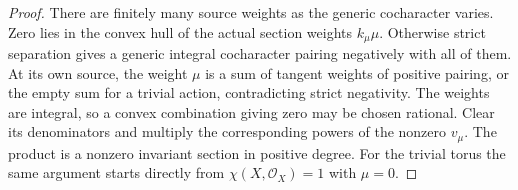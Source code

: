 \begin{proof}
There are finitely many source weights as the generic cocharacter
varies.  Zero lies in the convex hull of the actual section weights
$k_\mu\mu$.  Otherwise strict separation gives a generic integral
cocharacter pairing negatively with all of them.  At its own source,
the weight $\mu$ is a sum of tangent weights of positive pairing,
or the empty sum for a trivial action, contradicting strict
negativity.  The weights are integral, so a convex combination
giving zero may be chosen rational.  Clear its denominators and
multiply the corresponding powers of the nonzero $v_\mu$.
The product is a nonzero invariant section in positive degree.
For the trivial torus the same argument starts directly from
$\chi(X,\mathcal O_X)=1$ with $\mu=0$.
\end{proof}
